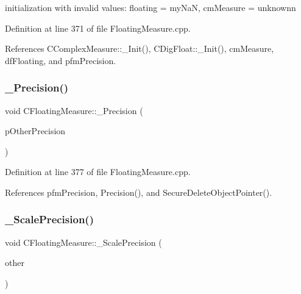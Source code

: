 initialization with invalid values\+: floating = my\+NaN, cm\+Measure = unknownn 



Definition at line 371 of file Floating\+Measure.\+cpp.



References C\+Complex\+Measure\+::\+\_\+\+Init(), C\+Dig\+Float\+::\+\_\+\+Init(), cm\+Measure, df\+Floating, and pfm\+Precision.

\mbox{\label{classCFloatingMeasure_a8e16f55f29d0d4c4148307a1f5953fe3}} 
\subsubsection{\texorpdfstring{\+\_\+\+Precision()}{\_Precision()}}
{\footnotesize\ttfamily void C\+Floating\+Measure\+::\+\_\+\+Precision (\begin{DoxyParamCaption}\item[{const \hyperlink{classCFloatingMeasure}{C\+Floating\+Measure} $\ast$}]{p\+Other\+Precision }\end{DoxyParamCaption})\hspace{0.3cm}{\ttfamily [protected]}}



Definition at line 377 of file Floating\+Measure.\+cpp.



References pfm\+Precision, Precision(), and Secure\+Delete\+Object\+Pointer().

\mbox{\label{classCFloatingMeasure_a9eb8748502d6f118fa631749165a6d6e}} 
\subsubsection{\texorpdfstring{\+\_\+\+Scale\+Precision()}{\_ScalePrecision()}}
{\footnotesize\ttfamily void C\+Floating\+Measure\+::\+\_\+\+Scale\+Precision (\begin{DoxyParamCaption}\item[{const \hyperlink{classCComplexMeasure}{C\+Complex\+Measure} \&}]{other }\end{DoxyParamCaption})\hspace{0.3cm}{\ttfamily [protected]}}



